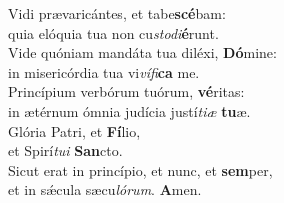 \evenverse Vidi prævaricántes, et tabe\textbf{scé}bam:~\*\\
\evenverse quia elóquia tua non cu\textit{sto}\textit{di}\textbf{é}runt.\\
\oddverse Vide quóniam mandáta tua diléxi, \textbf{Dó}mine:~\*\\
\oddverse in misericórdia tua vi\textit{ví}\textit{fi}\textbf{ca} me.\\
\evenverse Princípium verbórum tuórum, \textbf{vé}ritas:~\*\\
\evenverse in ætérnum ómnia judícia justí\textit{ti}\textit{æ} \textbf{tu}æ.\\
\oddverse Glória Patri, et \textbf{Fí}lio,~\*\\
\oddverse et Spirí\textit{tu}\textit{i} \textbf{San}cto.\\
\evenverse Sicut erat in princípio, et nunc, et \textbf{sem}per,~\*\\
\evenverse et in sǽcula sæcu\textit{ló}\textit{rum}. \textbf{A}men.\\
